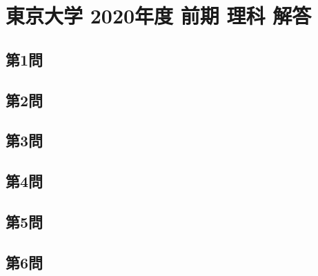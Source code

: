 ﻿\documentclass[../../uem_tok_a.tex]{subfiles}
\begin{document}
    \section{東京大学 2020年度 前期 理科 解答}

    \subsection{第1問}
    

    \clearpage
    \subsection{第2問}
    

    \clearpage
    \subsection{第3問}
    

    \clearpage
    \subsection{第4問}
    

    \clearpage
    \subsection{第5問}
    

    \clearpage
    \subsection{第6問}
    

    \clearpage
\end{document}
